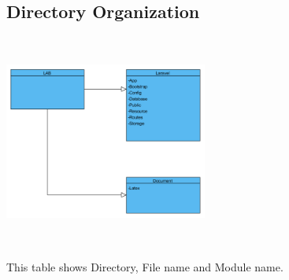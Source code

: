 \documentclass[letterpaper, 10 pt, conference]{ieeeconf}  %
\begin{document}
\begin{center}
\end{center}




\subsection{Directory Organization}
\begin{center}
\includegraphics[width=0.5\textwidth,height = 7cm]{bibliographies/image/module1.png}
\end{center}
This table shows Directory, File name and Module name.
\end{document}
